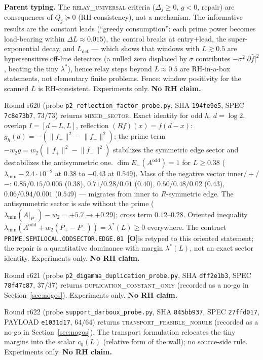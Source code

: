 \documentclass[11pt]{article}
\newcommand{\mO}{\textcolor{openred}{\textbf{[O]}}}
\theoremstyle{definition}
\theoremstyle{remark}
\begin{document}
\textbf{Parent typing.}  The \textsc{relay\_universal} criteria
($\Delta_j\ge 0$, $g<0$, repair) are consequences of
$Q_j\succeq 0$ (RH-consistency), not a mechanism.  The
informative results are the constant leads (``greedy
consumption'': each prime power becomes load-bearing within
$\Delta L\approx 0.015$), the control breaks at entry+lead,
the super-exponential decay, and $L_{\mathrm{det}}$ --- which
shows that windows with $L\gtrsim 0.5$ are hypersensitive
off-line detectors (a nulled zero displaced by $\sigma$
contributes $-\sigma^2\lvert\partial\hat f\rvert^2$, beating
the tiny $\lambda^*$), hence relay steps beyond $L\approx 0.5$
are RH-in-a-box statements, not elementary finite problems.
Fence: window positivity for the scanned $L$ is RH-consistent.
Experiments only.  \textbf{No RH claim.}

\noindent Round r620 (probe \texttt{p2\_reflection\_factor\_probe.py},
SHA \texttt{194fe9e5}, SPEC \texttt{7c8e73b7}, $73/73$) returns
\textsc{mixed\_sector}.  Exact identity for odd $h$,
$d=\log 2$, overlap $I=[d-L,L]$, reflection
$(Rf)(x)=f(d-x)$:
$g_h(d)=-(\lVert f_+\rVert^2-\lVert f_-\rVert^2)$; the prime
term $-w_2 g=w_2(\lVert f_+\rVert^2-\lVert f_-\rVert^2)$
stabilizes the symmetric edge sector and destabilizes the
antisymmetric one.  $\dim E_-(A^{\mathrm{odd}})=1$ for
$L\ge 0.38$ ($\lambda_{\min}-2.4\cdot 10^{-2}$ at $0.38$ to
$-0.43$ at $0.549$).  Mass of the negative vector
inner$/+$/$-$: $0.85/0.15/0.005$ ($0.38$), $0.71/0.28/0.01$
($0.40$), $0.50/0.48/0.02$ ($0.43$), $0.06/0.94/0.001$
($0.549$) --- migrates from inner to $R$-symmetric edge.  The
antisymmetric sector is safe without the prime
($\lambda_{\min}(A|_{P_-})-w_2=+5.7\to +0.29$); cross term
$0.12$--$0.28$.  Oriented inequality
$\lambda_{\min}(A^{\mathrm{odd}}+w_2(P_+-P_-))=\lambda^*(L)\ge 0$
everywhere.  The contract
\texttt{PRIME.SEMILOCAL.ODDSECTOR.EDGE.01}~\mO is retyped to
this oriented statement; the repair is a quantitative
dominance with margin $\lambda^*(L)$, not an exact sector
identity.  Experiments only.  \textbf{No RH claim.}

\noindent Round r621 (probe \texttt{p2\_digamma\_duplication\_probe.py},
SHA \texttt{dff2e1b3}, SPEC \texttt{78f47c87}, $37/37$) returns
\textsc{duplication\_constant\_only} (recorded as a no-go in
Section~\ref{sec:nogos}).  Experiments only.
\textbf{No RH claim.}

\noindent Round r622 (probe \texttt{support\_darboux\_probe.py},
SHA \texttt{845bb937}, SPEC \texttt{27ffd017}, PAYLOAD
\texttt{e1031d17}, $64/64$) returns
\textsc{transport\_feasible\_norule} (recorded as a no-go in
Section~\ref{sec:nogos}).  The transport formulation relocates
the tiny margins into the scalar $c_0(L)$ (relative form of
the wall); no source-side rule.  Experiments only.
\textbf{No RH claim.}
\end{document}
